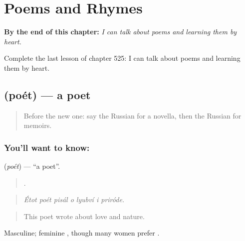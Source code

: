 
\chapter{Poems and Rhymes}
\label{ch:ru-poems-and-rhymes}

\begin{chapteropening}
\textbf{By the end of this chapter:} \emph{I can talk about poems and learning them by heart.}

Complete the last lesson of chapter 525: I can talk about poems and learning them by heart.
\end{chapteropening}

\section[\texorpdfstring{\ru{поэт} (poét)}{поэт (poét)}]{ (poét) — a poet}

\label{lesson:RU-C525-poet}



\begin{quote}
Before the new one: say the Russian for a novella, then the Russian for memoirs.
\end{quote}

\subsection*{You'll want to know: }
\textbf{} (\emph{poét}) — \textquotedblleft{}a poet\textquotedblright{}.

\begin{quote}
      .
\end{quote}

\begin{quote}
\emph{Étot poét pisál o lyubví i priróde.}
\end{quote}

\begin{quote}
This poet wrote about love and nature.
\end{quote}

Masculine; feminine , though many women prefer \emph{}.

